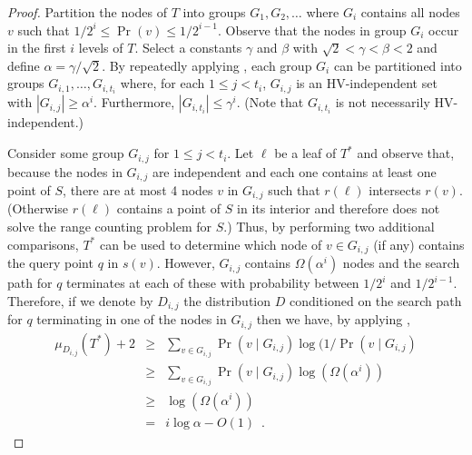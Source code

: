 \documentclass[lotsofwhite,charterfonts]{patmorin}
\begin{document}
\begin{proof}
Partition the nodes of $T$ into groups $G_1,G_2,\ldots$ where $G_i$
contains all nodes $v$ such that $1/2^{i} \le \Pr(v) \le 1/2^{i-1}$.
Observe that the nodes in group $G_i$ occur in the first $i$ levels of
$T$.  Select a constants $\gamma$ and $\beta$ with $\sqrt{2} < \gamma
< \beta < 2$ and define $\alpha=\gamma/\sqrt{2}$.  By
repeatedly applying , each group $G_i$ can be
partitioned into groups $G_{i,1},\ldots,G_{i,t_i}$ where, for each $1
\le j < t_i$, $G_{i,j}$ is an HV-independent set with $|G_{i,j}|
\ge \alpha^i$.  Furthermore, $|G_{i,t_i}| \le \gamma^i$. (Note that
$G_{i,t_i}$ is not necessarily HV-independent.)

Consider some group $G_{i,j}$ for $1\le j < t_i$.  Let $\ell$ be a
leaf of $T^*$ and observe that, because the nodes in $G_{i,j}$ are
independent and each one contains at least one point of $S$, there are
at most 4 nodes $v$ in $G_{i,j}$ such that $r(\ell)$ intersects
$r(v)$.  (Otherwise $r(\ell)$ contains a point of $S$ in its interior
and therefore does not solve the range counting problem for $S$.)
Thus, by performing two additional comparisons, $T^*$ can be used to
determine which node of $v\in G_{i,j}$ (if any) contains the query
point $q$ in $s(v)$.  However, $G_{i,j}$ contains $\Omega(\alpha^i)$
nodes and the search path for $q$ terminates at each of these with
probability between $1/2^i$ and $1/2^{i-1}$.  Therefore, if we denote
by $D_{i,j}$ the distribution $D$ conditioned on the search path for
$q$ terminating in one of the nodes in $G_{i,j}$ then we have, by
applying
,
\begin{eqnarray*}
   \mu_{D_{i,j}}(T^*) + 2 
    & \ge & \sum_{v\in G_{i,j}}\Pr(v\mid G_{i,j})\log(1/\Pr(v\mid G_{i,j}) \\
    & \ge & \sum_{v\in G_{i,j}}\Pr(v\mid G_{i,j})\log(\Omega(\alpha^i)) \\
    & \ge & \log(\Omega(\alpha^i)) \\
    & = & i\log\alpha - O(1) \enspace .
\end{eqnarray*}


\end{proof}
\end{document}
